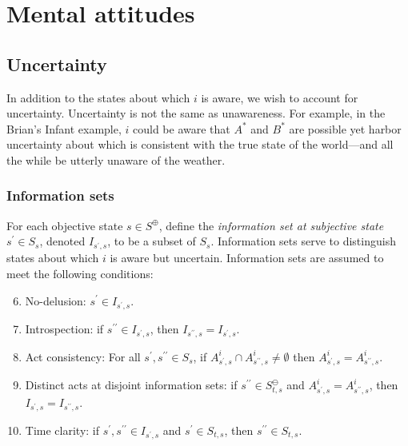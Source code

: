\documentclass[
11pt,
titlepage,
reqno,
]{article}%
\theoremstyle{definition}
\begin{document}
\section{Mental attitudes}
	
\subsection{Uncertainty}
	
In addition to the states about which $i$ is aware, we wish to account for uncertainty. 
Uncertainty is not the same as unawareness.
For example, in the Brian's Infant example, $i$ could be aware that $A^\ast$ and $B^\ast$ are possible yet harbor uncertainty about which is consistent with the true state of the world---and all the while be utterly unaware of the weather.

\subsubsection{Information sets}
For each objective state $s\in S^\oplus$, define the\textit{ information set at subjective state} $s^\prime\in S_s$, denoted $I_{s^\prime,s}$,  to be a subset of $S_s$.  
Information sets serve to distinguish states about which $i$ is aware but uncertain. 
Information sets are assumed to meet the following conditions:	
\begin{enumerate}
	\setcounter{enumi}{5}
	\item No-delusion: $s^\prime\in I_{s^\prime,s}$.
	\item Introspection: if $s^{\prime\prime}\in I_{s^\prime,s}$, then $I_{s^{\prime\prime},s}=I_{s^\prime,s}$.
	\item Act consistency: For all $s^\prime,s^{\prime\prime}\in S_s$, if $A^i_{s^\prime,s}\cap A^i_{s^{\prime\prime},s}\ne \emptyset$ then $A^i_{s^\prime,s}= A^i_{s^{\prime\prime},s}$.
	\item Distinct acts at disjoint information sets: if $s^{\prime\prime}\in S^\ominus_{t,s}$ and $A^i_{s^\prime,s}= A^i_{s^{\prime\prime},s}$, then $I_{s^\prime,s}=I_{s^{\prime\prime},s}$.
	\item Time clarity: if $s^\prime,s^{\prime\prime}\in I_{s^\prime,s}$ and $s^\prime\in S_{t,s}$, then $s^{\prime\prime}\in S_{t,s}$.
\end{enumerate}
\end{document}
